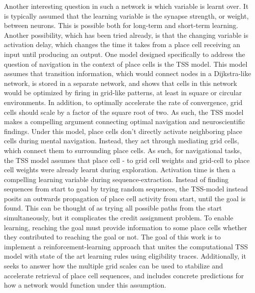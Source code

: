 \documentclass{article}
\begin{document}
    Another interesting question in such a network is which variable is learnt over. It is typically assumed that the learning variable is the synapse strength, or weight, between neurons. This is possible both for long-term and short-term learning. Another possibility, which has been tried already, is that the changing variable is activation delay, which changes the time it takes from a place cell receiving an input until producing an output.
    One model designed specifically to address the question of navigation in the context of place cells is the TSS model. This model assumes that transition information, which would connect nodes in a Dijkstra-like network, is stored in a separate network, and shows that cells in this network would be optimized by firing in grid-like patterns, at least in square or circular environments. In addition, to optimally accelerate the rate of convergence, grid cells should scale by a factor of the square root of two. As such, the TSS model makes a compelling argument connecting optimal navigation and neuroscientific findings.
    Under this model, place cells don’t directly activate neighboring place cells during mental navigation. Instead, they act through mediating grid cells, which connect them to surrounding place cells. As such, for navigational tasks, the TSS model assumes that place cell - to grid cell weights and grid-cell to place cell weights were already learnt during exploration. Activation time is then a compelling learning variable during sequence-extraction.
    Instead of finding sequences from start to goal by trying random sequences, the TSS-model instead posits an outwards propagation of place cell activity from start, until the goal is found. This can be thought of as trying all possible paths from the start simultaneously, but it complicates the credit assignment problem. To enable learning, reaching the goal must provide information to some place cells whether they contributed to reaching the goal or not.
    The goal of this work is to implement a reinforcement-learning approach that unites the computational TSS model with state of the art learning rules using eligibility traces. Additionally, it seeks to answer how the multiple grid scales can be used to stabilize and accelerate retrieval of place cell sequences, and includes concrete predictions for how a network would function under this assumption.
    
\end{document}
